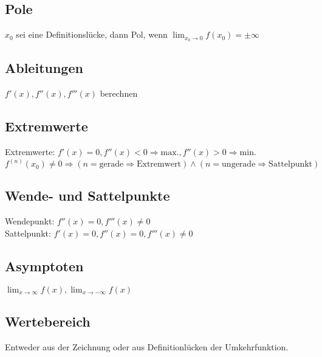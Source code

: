 \subsection{Pole}
$x_0$ sei eine Definitionslücke, dann Pol, wenn $\lim_{x_0 \rightarrow 0}f(x_0) = \pm \infty$

\subsection{Ableitungen}
$f'(x), f''(x), f'''(x)$ berechnen

\subsection{Extremwerte}
Extremwerte: $f'(x) = 0, f''(x) < 0 \Rightarrow \mbox{max.}, f''(x) > 0 \Rightarrow \mbox{min.}$
$f^{(n)}(x_0) \neq 0 \Rightarrow (n = \mbox{gerade} \Rightarrow \mbox{Extremwert}) \wedge (n = \mbox{ungerade} \Rightarrow \mbox{Sattelpunkt})$

\subsection{Wende- und Sattelpunkte}
Wendepunkt: $f''(x) = 0, f'''(x) \neq 0$\\
Sattelpunkt: $f'(x) = 0, f''(x) = 0, f'''(x) \neq 0$

\subsection{Asymptoten}
$\lim_{x \rightarrow \infty} f(x), \lim_{x \rightarrow -\infty} f(x)$

\subsection{Wertebereich}
Entweder aus der Zeichnung oder aus Definitionlücken der Umkehrfunktion.
